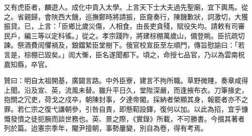 \begin{pinyinscope}
又有虎臣者，麟遊人。成化中貢入太學。上言天下士大夫過先聖廟，宜下輿馬。從之。省親歸，會陜西大饑，巡撫鄭時將請振，臣齎奏行，陳饑歉狀，詞激切，大獲振貸。已，上言：「臣鄉比歲災傷，人相食，由長吏貪殘，賦役失均。請敕有司審民戶，編三等以定科徭。」從之。孝宗踐阼，將建棕棚萬歲山，備登眺。臣抗疏切諫。祭酒費訚懼禍及，鋃鐺縶臣堂樹下。俄官校宣臣至左順門，傳旨慰諭曰：「若言是，棕棚已毀矣。」訚大慚，臣名遂聞都下。頃之，命授七品官，乃以為雲南柷嘉知縣，卒官。

贊曰：明自太祖開基，廣闢言路。中外臣寮，建言不拘所職。草野微賤，奏章咸得上聞。沿及宣、英，流風未替。雖升平日久，堂陛深嚴，而逢掖布衣。刀筆掾史，抱關之冗吏，荷戈之戍卒，朝陳封事，夕達帝閽。採納者榮顯其身，報罷者亦不之罪。若仁宗之復弋謙朝參，引咎自責，即懸鞀設鐸，復何以加。以此為招，宜乎慷慨發憤之徒扼腕而談世務也。英、景之際，《實錄》所載，不可勝書。今掇其著者列於篇。迨憲宗季年，閹尹擅朝，事勢屢變，別自為卷，得有考焉。


\end{pinyinscope}